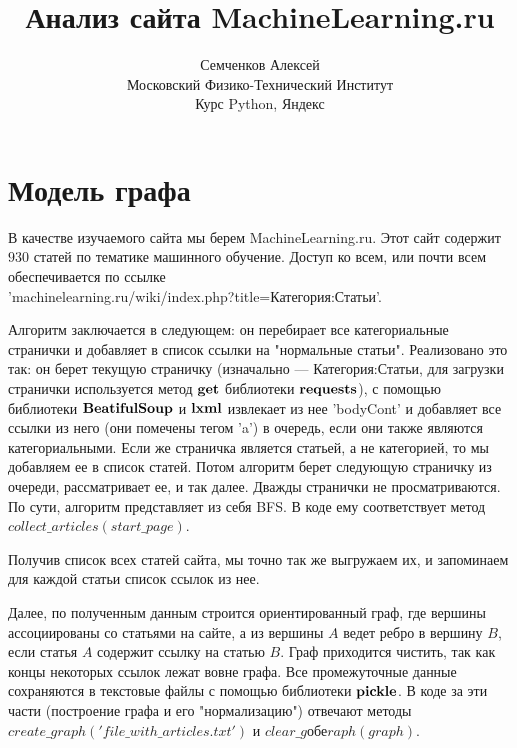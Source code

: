 \documentclass{article}
\begin{document}
\title {Анализ сайта MachineLearning.ru}
\author {Семченков Алексей\\Московский Физико-Технический Институт\\Курс Python, Яндекс}
\maketitle

\section{Модель графа}
 
В качестве изучаемого сайта мы берем MachineLearning.ru. Этот сайт содержит $930$ статей по тематике машинного обучение. Доступ ко всем, или почти всем обеспечивается по ссылке\\ 'machinelearning.ru/wiki/index.php?title=Категория:Статьи'.

\bigskip

Алгоритм заключается в следующем: он перебирает все категориальные странички и добавляет в список ссылки на "нормальные статьи". Реализовано это так: он берет текущую страничку (изначально --- Категория:Статьи, для загрузки странички используется метод $\bf get$ библиотеки $\bf requests$), с помощью библиотеки $\bf BeatifulSoup$ и $\bf lxml$ извлекает из нее 'bodyCont' и добавляет все ссылки из него (они помечены тегом 'a') в очередь, если они также являются категориальными. Если же страничка является статьей, а не категорией, то мы добавляем ее в  список статей. Потом алгоритм берет следующую страничку из очереди, рассматривает ее, и так далее. Дважды странички не просматриваются. По сути, алгоритм представляет из себя BFS. В коде ему соответствует метод $collect\_articles(start\_page)$.

\bigskip

Получив список всех статей сайта, мы точно так же выгружаем их, и запоминаем для каждой статьи список ссылок из нее. 

\bigskip

Далее, по полученным данным строится ориентированный граф, где вершины ассоциированы со статьями на сайте, а из вершины $A$ ведет ребро в вершину $B$, если статья $A$ содержит ссылку на статью $B$. Граф приходится чистить, так как концы некоторых ссылок лежат вовне графа. Все промежуточные данные сохраняются в текстовые файлы с помощью библиотеки $\bf pickle$. В коде за  эти части (построение графа и его "нормализацию") отвечают методы $create\_graph('file\_with\_articles.txt')$ и $clear\_gобеraph(graph)$.
\end{document}
